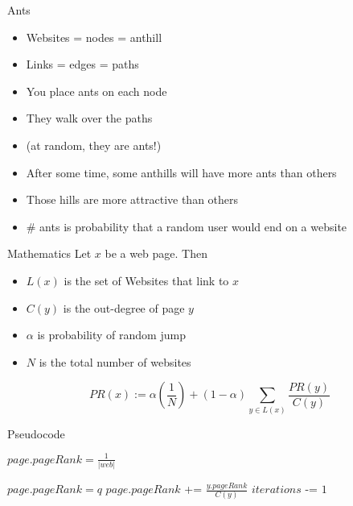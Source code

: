 \begin{frame}{Ants}
    \begin{itemize}[<+->]
        \item Websites = nodes = anthill
        \item Links = edges = paths
        \item You place ants on each node
        \item They walk over the paths
        \item[] (at random, they are ants!)
        \item After some time, some anthills will have more ants than
              others
        \item Those hills are more attractive than others
        \item \# ants is probability that a random user would end on
              a website
    \end{itemize}
\end{frame}

\begin{frame}{Mathematics}
    Let $x$ be a web page. Then
    \begin{itemize}
        \item $L(x)$ is the set of Websites that link to $x$
        \item $C(y)$ is the out-degree of page $y$
        \item $\alpha$ is probability of random jump
        \item $N$ is the total number of websites
    \end{itemize}

    \[\displaystyle PR(x) := \alpha \left ( \frac{1}{N} \right ) + (1-\alpha) \sum_{y\in L(x)} \frac{PR(y)}{C(y)}\]
\end{frame}

\begin{frame}{Pseudocode}
        \begin{algorithmic}
                 
                     \State $page.pageRank = \frac{1}{|web|}$ 
                 \EndFor

                 
                      
                         \State $page.pageRank = q$
                         
                             \State $page.pageRank$ += $\frac{y.pageRank}{C(y)}$
                         \EndFor
{}                     \EndFor
{}                     \State $iterations$ -= $1$
                 \EndWhile
{}             \EndFunction
        \end{algorithmic}
\end{frame}
